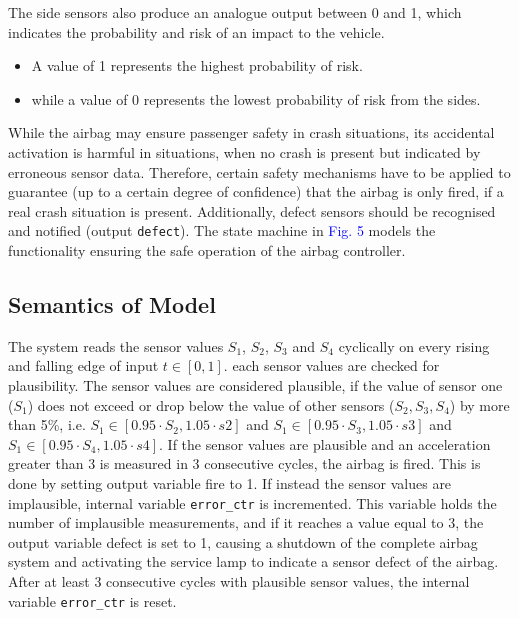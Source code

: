 \documentclass[12pt	]{article}
\begin{document}
The side sensors also produce an analogue output between 0 and 1, which indicates the probability and risk of an impact to the vehicle.

\begin{itemize}
	\item A value of 1 represents the highest probability of risk.
	\item while a value of 0 represents the lowest probability of risk from the sides.
\end{itemize}


While the airbag may ensure passenger safety in crash situations, its accidental activation is harmful in situations, when no crash is present but indicated by erroneous sensor data. Therefore, certain safety mechanisms have to be applied to guarantee (up to a certain degree of confidence) that the airbag is only fired, if a real crash situation is present. Additionally, defect sensors should be recognised and notified (output \texttt{defect}). The state machine in \textcolor{blue}{Fig. 5} models the functionality ensuring the safe operation of the airbag controller.


\subsection{Semantics of Model}
The system reads the sensor values $S_1$, $S_2$, $S_3$ and $S_4$ cyclically on every rising and falling edge of input $t \in [0, 1]$. each sensor values are checked for plausibility. The sensor values are considered plausible, if the value of sensor one ($S_1$) does not exceed or drop below the value of other sensors ($S_2, S_3, S_4$) by more than 5\%, i.e. $S_1 \in [0.95 \cdot S_2, 1.05 \cdot s2]$ and $S_1 \in [0.95 \cdot S_3, 1.05 \cdot s3]$ and $S_1 \in [0.95 \cdot S_4, 1.05 \cdot s4]$. If the sensor values
are plausible and an acceleration greater than 3 is measured in 3 consecutive cycles, the airbag is fired. This is done by setting output variable fire to 1. If instead the sensor values are implausible, internal variable \texttt{error\_ctr} is incremented. This variable holds the number of implausible measurements, and if it reaches a value equal to 3, the output variable defect is set to 1, causing a shutdown of the complete airbag system and activating the service lamp to indicate a sensor defect of the airbag. After at least 3 consecutive cycles with plausible sensor values, the internal variable \texttt{error\_ctr} is reset.
\end{document}
